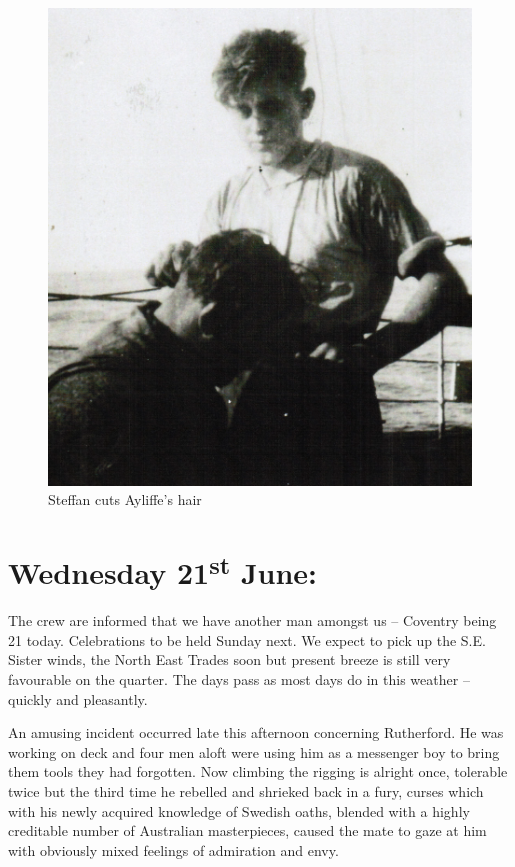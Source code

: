 \documentclass[
  11pt,
  msmallroyalvopaper
]{memoir}
\begin{document}
\begin{figure}
\centering
\includegraphics{./images/image026.png}
\caption{Steffan cuts Ayliffe's hair}
\end{figure}

\hypertarget{wednesday-21st-june}{%
\section{\texorpdfstring{Wednesday 21\textsuperscript{st}
June:}{Wednesday 21st June:}}\label{wednesday-21st-june}}

The crew are informed that we have another man amongst us -- Coventry
being 21 today. Celebrations to be held Sunday next. We expect to pick
up the S.E. Sister winds, the North East Trades soon but present breeze
is still very favourable on the quarter. The days pass as most days do
in this weather -- quickly and pleasantly.

An amusing incident occurred late this afternoon concerning Rutherford.
He was working on deck and four men aloft were using him as a messenger
boy to bring them tools they had forgotten. Now climbing the rigging is
alright once, tolerable twice but the third time he rebelled and
shrieked back in a fury, curses which with his newly acquired knowledge
of Swedish oaths, blended with a highly creditable number of Australian
masterpieces, caused the mate to gaze at him with obviously mixed
feelings of admiration and envy.
\end{document}
